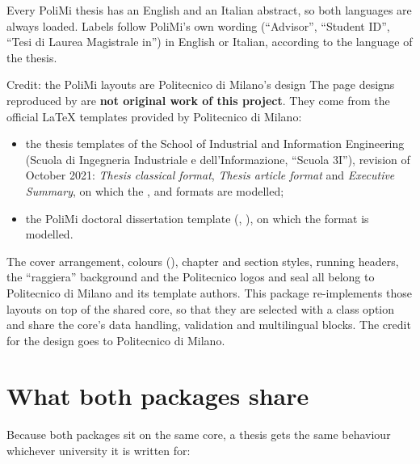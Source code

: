 \documentclass[11pt,a4paper]{article}
\begin{document}
Every PoliMi thesis has an English and an Italian abstract, so both
languages are always loaded. Labels follow PoliMi's own wording
(``Advisor'', ``Student ID'', ``Tesi di Laurea Magistrale in'') in English
or Italian, according to the language of the thesis.

\begin{notebox}[bluepoli]{Credit: the PoliMi layouts are Politecnico di Milano's design}
The page designs reproduced by  are \textbf{not
original work of this project}. They come from the official \LaTeX{}
templates provided by Politecnico di Milano:
\begin{itemize}
  \item the thesis templates of the School of Industrial and Information
    Engineering (Scuola di Ingegneria Industriale e dell'Informazione,
    ``Scuola 3I''), revision of October 2021: \emph{Thesis classical
    format}, \emph{Thesis article format} and \emph{Executive Summary},
    on which the ,  and  formats
    are modelled;
  \item the PoliMi doctoral dissertation template (,
    ), on which the  format is modelled.
\end{itemize}
The cover arrangement, colours (), chapter and section
styles, running headers, the ``raggiera'' background and the Politecnico
logos and seal all belong to Politecnico di Milano and its template
authors. This package re-implements those layouts on top of the shared
 core, so that they are selected with a class option
and share the core's data handling, validation and multilingual blocks.
The credit for the design goes to Politecnico di Milano.
\end{notebox}

\section{What both packages share}

Because both packages sit on the same core, a thesis gets the same
behaviour whichever university it is written for:
\end{document}
